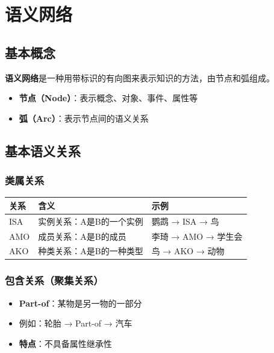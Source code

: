 \section{语义网络}

\subsection{基本概念}
\begin{conceptbox}
\textbf{语义网络}是一种用带标识的有向图来表示知识的方法，由节点和弧组成。
\end{conceptbox}

\begin{itemize}[leftmargin=2em,itemsep=0pt]
    \item \textbf{节点（Node）}：表示概念、对象、事件、属性等
    \item \textbf{弧（Arc）}：表示节点间的语义关系
\end{itemize}

\subsection{基本语义关系}

\subsubsection{类属关系}
\begin{table}[htbp]
\centering\small
\begin{tabular}{lll}
\toprule
\textbf{关系} & \textbf{含义} & \textbf{示例} \\
\midrule
ISA & 实例关系：A是B的一个实例 & 鹦鹉 → ISA → 鸟 \\
AMO & 成员关系：A是B的成员 & 李琦 → AMO → 学生会 \\
AKO & 种类关系：A是B的一种类型 & 鸟 → AKO → 动物 \\
\bottomrule
\end{tabular}
\end{table}

\subsubsection{包含关系（聚集关系）}
\begin{itemize}[leftmargin=2em,itemsep=0pt]
    \item \textbf{Part-of}：某物是另一物的一部分
    \item 例如：轮胎 → Part-of → 汽车
    \item \textbf{特点}：不具备属性继承性
\end{itemize}

